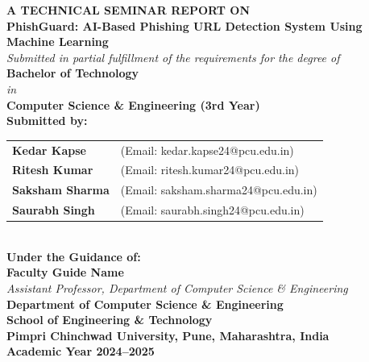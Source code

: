 \documentclass[12pt,a4paper]{report}
\begin{document}
\begin{titlepage}
    \centering
    \vspace*{0.3in}
    {\Large \textbf{A TECHNICAL SEMINAR REPORT ON}}\\[0.25in]
    {\LARGE \textbf{PhishGuard: AI-Based Phishing URL Detection System Using Machine Learning}}\\[0.4in]
    
    \textit{Submitted in partial fulfillment of the requirements for the degree of}\\[0.15in]
    \textbf{Bachelor of Technology}\\[0.1in]
    \textit{in}\\[0.1in]
    \textbf{Computer Science \& Engineering (3rd Year)}\\[0.35in]
    
    \textbf{Submitted by:}\\[0.1in]
    \begin{tabular}{ll}
        \textbf{Kedar Kapse}   & (Email: kedar.kapse24@pcu.edu.in) \\
        \textbf{Ritesh Kumar}  & (Email: ritesh.kumar24@pcu.edu.in) \\
        \textbf{Saksham Sharma}& (Email: saksham.sharma24@pcu.edu.in) \\
        \textbf{Saurabh Singh} & (Email: saurabh.singh24@pcu.edu.in) \\
    \end{tabular}
    \\[0.35in]
    
    \textbf{Under the Guidance of:}\\[0.1in]
    \textbf{Faculty Guide Name}\\[0.05in]
    \textit{Assistant Professor, Department of Computer Science \& Engineering}\\[0.35in]
    
    \textbf{Department of Computer Science \& Engineering}\\
    \textbf{School of Engineering \& Technology}\\
    \textbf{Pimpri Chinchwad University, Pune, Maharashtra, India}\\
    \textbf{Academic Year 2024--2025}
\end{titlepage}

\end{document}
